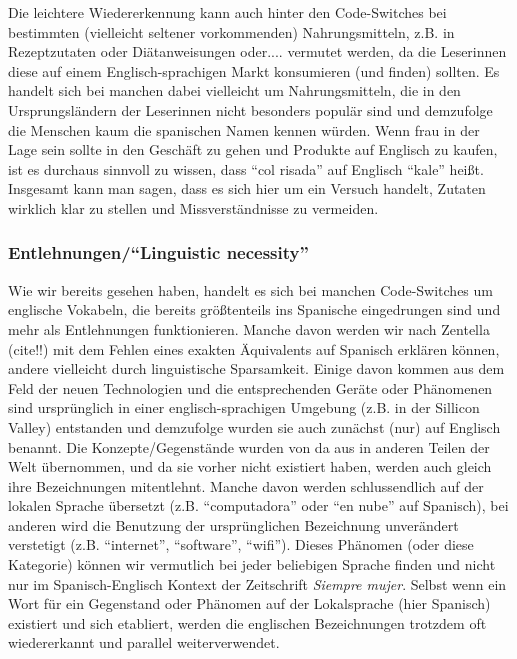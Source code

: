 Die leichtere Wiedererkennung kann auch hinter den Code-Switches bei bestimmten (vielleicht seltener vorkommenden) Nahrungsmitteln, z.B. in Rezeptzutaten oder Diätanweisungen oder.... vermutet werden, da die Leserinnen diese auf einem Englisch-sprachigen Markt konsumieren (und finden) sollten.
Es handelt sich bei manchen dabei vielleicht um Nahrungsmitteln, die in den Ursprungsländern der Leserinnen nicht besonders populär sind und demzufolge die Menschen kaum die spanischen Namen kennen würden.
Wenn frau in der Lage sein sollte in den Geschäft zu gehen und Produkte auf Englisch zu kaufen, ist es durchaus sinnvoll zu wissen, dass ``col risada'' auf Englisch ``kale'' heißt.
Insgesamt kann man sagen, dass es sich hier um ein Versuch handelt, Zutaten wirklich klar zu stellen und Missverständnisse zu vermeiden.

\subsubsection{Entlehnungen/``Linguistic necessity''}
Wie wir bereits gesehen haben, handelt es sich bei manchen Code-Switches um englische Vokabeln, die bereits größtenteils ins Spanische eingedrungen sind und mehr als Entlehnungen funktionieren.
Manche davon werden wir nach Zentella (cite!!) mit dem Fehlen eines exakten Äquivalents auf Spanisch erklären können, andere vielleicht durch linguistische Sparsamkeit. %
Einige davon kommen aus dem Feld der neuen Technologien und die entsprechenden Geräte oder Phänomenen sind ursprünglich in einer englisch-sprachigen Umgebung (z.B. in der Sillicon Valley) entstanden und demzufolge wurden sie auch zunächst (nur) auf Englisch benannt.
Die Konzepte/Gegenstände wurden von da aus in anderen Teilen der Welt übernommen, und da sie vorher nicht existiert haben, werden auch gleich ihre Bezeichnungen mitentlehnt.
Manche davon werden schlussendlich auf der lokalen Sprache übersetzt (z.B. ``computadora'' oder ``en nube'' auf Spanisch), bei anderen wird die Benutzung der ursprünglichen Bezeichnung unverändert verstetigt (z.B. ``internet'', ``software'', ``wifi'').
Dieses Phänomen (oder diese Kategorie) können wir vermutlich bei jeder beliebigen Sprache finden und nicht nur im Spanisch-Englisch Kontext der Zeitschrift \textit{Siempre mujer}.
Selbst wenn ein Wort für ein Gegenstand oder Phänomen auf der Lokalsprache (hier Spanisch) existiert und sich etabliert, werden die englischen Bezeichnungen trotzdem oft wiedererkannt und parallel weiterverwendet.

